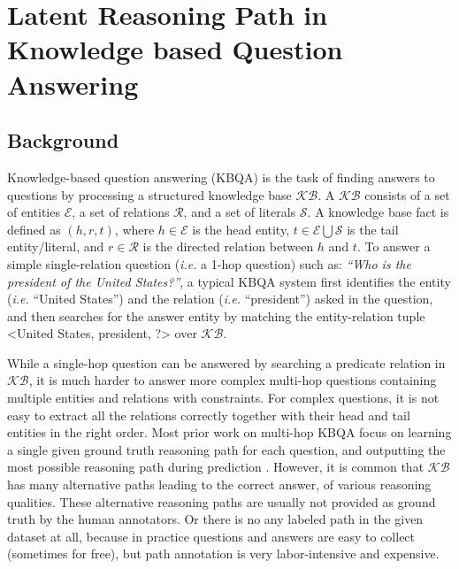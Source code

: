 \section{Latent Reasoning Path in Knowledge based Question Answering}\label{sec:2-2}

\subsection{Background}

Knowledge-based question answering (KBQA) is the task of finding answers to questions by processing a structured knowledge base $\mathcal{KB}$. %
A $\mathcal{KB}$ consists of a set of entities $\mathcal{E}$, a set of relations $\mathcal{R}$, and a set of literals $\mathcal{S}$. A knowledge base fact is defined as $(h,r,t)$, where $h\in \mathcal{E}$ is the head entity, $t \in \mathcal{E} \bigcup \mathcal{S}$ is the tail entity/literal, and $r\in \mathcal{R}$ is the directed relation between $h$ and $t$. To answer a simple single-relation question (\emph{i.e.} a 1-hop question) such as: \textit{``Who is the president of the United States?''}, a typical KBQA system first identifies the entity (\emph{i.e.} ``United States'') and the relation (\emph{i.e.} ``president'') asked in the question, and then searches for the answer entity by matching the entity-relation tuple <United States, president, ?> over $\mathcal{KB}$.

While a single-hop question can be answered by searching a predicate relation in $\mathcal{KB}$, it is much harder to answer more complex multi-hop questions containing multiple entities and relations with constraints. For complex questions, it is not easy to extract all the relations correctly together with their head and tail entities in the right order. Most prior work on multi-hop KBQA focus on learning a single given ground truth reasoning path for each question, and outputting the most possible reasoning path during prediction \cite{DBLP:conf/coling/ZhouHZ18,DBLP:journals/corr/abs-1801-09893,DBLP:conf/adbis/YuHYZW18,DBLP:conf/ijcai/LanW019}. However, it is common that $\mathcal{KB}$ has many alternative paths leading to the correct answer, of various reasoning qualities. These alternative reasoning paths are usually not provided as ground truth by the human annotators. Or there is no any labeled path in the given dataset at all, because in practice questions and answers are easy to collect (sometimes for free), but path annotation is very labor-intensive and expensive. 

